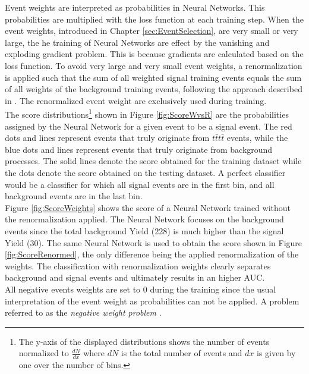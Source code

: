 Event weights are interpreted as probabilities in Neural Networks. This probabilities are multiplied with the loss function at each training step.
When the event weights, introduced in Chapter \ref{sec:EventSelection}, are very small or very large, the he training of Neural Networks are effect by the vanishing and exploding gradient problem. This is because gradients are calculated based on the loss function. To avoid very large and very small event weights, a renormalization is applied such that the sum of all weighted signal training events equals the sum of all weights of the background training events, following the approach described in \cite{TMVA}. The renormalized event weight are exclusively used during training. \\
The score distributions\footnote{The y-axis of the displayed distributions shows the number of events normalized to $\frac{dN}{dx}$ where $dN$ is the total number of events and $dx$ is given by one over the number of bins.} shown in Figure \ref{fig:ScoreWvsR} are the probabilities assigned by the Neural Network for a given event to be a signal event. The red dots and lines represent events that truly originate from $t\bar{t}t\bar{t}$ events, while the blue dots and lines represent events that truly originate from background processes. The solid lines denote the score obtained for the training dataset while the dots denote the score obtained on the testing dataset. A perfect classifier would be a classifier for which all signal events are in the first bin, and all background events are in the last bin. \\
Figure \ref{fig:ScoreWeights} shows the score of a Neural Network trained without the renormalization applied. The Neural Network focuses on the background events since the total background Yield (228) is much higher than the signal Yield (30). The same Neural Network is used to obtain the score shown in Figure \ref{fig:ScoreRenormed}, the only difference being the applied renormalization of the weights. The classification with renormalization weights clearly separates background and signal events and ultimately results in an higher AUC. \\
 All negative events weights are set to 0 during the training since the usual interpretation of the event weight as probabilities can not be applied. A problem referred to as the \textit{negative weight problem} \cite{nWeights}.